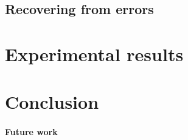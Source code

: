 \documentclass[twoside,a4paper]{article}
\begin{document}
\subsection{Recovering from errors}

\section{Experimental results}

\section{Conclusion}


\paragraph{Future work}






\end{document}
